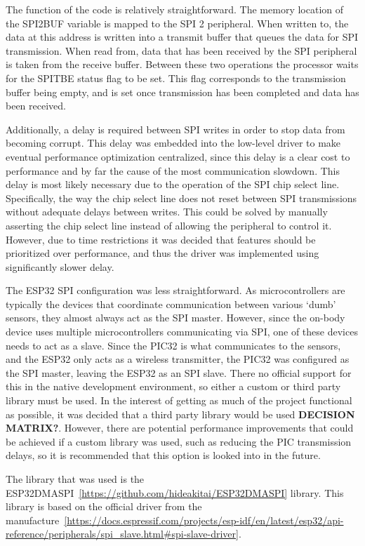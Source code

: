 The function of the code is relatively straightforward.
The memory location of the SPI2BUF variable is mapped to the SPI 2 peripheral.
When written to, the data at this address is written into a transmit buffer that queues the data for SPI transmission.
When read from, data that has been received by the SPI peripheral is taken from the receive buffer.
Between these two operations the processor waits for the SPITBE status flag to be set.
This flag corresponds to the transmission buffer being empty, and is set once transmission has been completed and data has been received.

Additionally, a delay is required between SPI writes in order to stop data from becoming corrupt.
This delay was embedded into the low-level driver to make eventual performance optimization centralized,
since this delay is a clear cost to performance and by far the cause of the most communication slowdown.
This delay is most likely necessary due to the operation of the SPI chip select line.
Specifically, the way the chip select line does not reset between SPI transmissions without adequate delays between writes.
This could be solved by manually asserting the chip select line instead of allowing the peripheral to control it.
However, due to time restrictions it was decided that features should be prioritized over performance,
and thus the driver was implemented using significantly slower delay.

The ESP32 SPI configuration was less straightforward.
As microcontrollers are typically the devices that coordinate communication between various `dumb' sensors,
they almost always act as the SPI master.
However, since the on-body device uses multiple microcontrollers communicating via SPI,
one of these devices needs to act as a slave.
Since the PIC32 is what communicates to the sensors, and the ESP32 only acts as a wireless transmitter,
the PIC32 was configured as the SPI master, leaving the ESP32 as an SPI slave.
There no official support for this in the native development environment, so either a custom or third party library must be used.
In the interest of getting as much of the project functional as possible, it was decided that a third party library would be used \textbf{DECISION MATRIX?}.
However, there are potential performance improvements that could be achieved if a custom library was used, such as reducing the PIC transmission delays,
so it is recommended that this option is looked into in the future.

The library that was used is the ESP32DMASPI~\ref{https://github.com/hideakitai/ESP32DMASPI} library.
This library is based on the official driver from the manufacture~\ref{https://docs.espressif.com/projects/esp-idf/en/latest/esp32/api-reference/peripherals/spi_slave.html#spi-slave-driver}.

